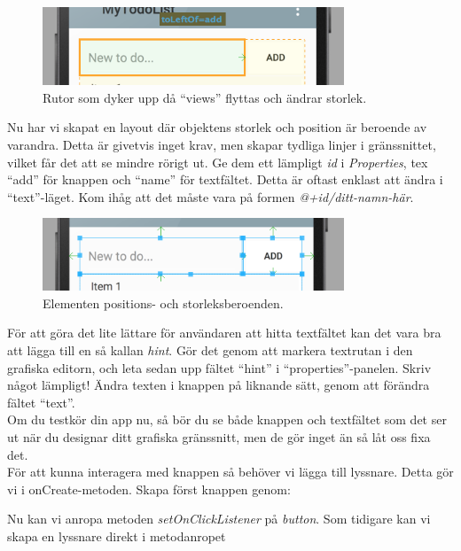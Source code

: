 \documentclass[11 pt, titlepage]{article} %
\begin{document}
\begin{figure}[ht!]
\centering
\includegraphics[width=90mm]{images/editing_layout.png}
\caption{Rutor som dyker upp då ``views'' flyttas och ändrar storlek.}
\label{overflow}
\end{figure}

Nu har vi skapat en layout där objektens storlek och position är beroende av varandra.
Detta är givetvis inget krav, men skapar tydliga linjer i gränssnittet, vilket får det att se mindre rörigt ut.
Ge dem ett lämpligt \textit{id} i \textit{Properties}, tex ``add'' för knappen och ``name'' för textfältet. Detta är oftast enklast att ändra i ``text''-läget.
Kom ihåg att det måste vara på formen \textit{@+id/ditt-namn-här}.\\

\begin{figure}[ht!]
\centering
\includegraphics[width=90mm]{images/layout.png}
\caption{Elementen positions- och storleksberoenden.}
\label{overflow}
\end{figure}

För att göra det lite lättare för användaren att hitta textfältet kan det vara bra att lägga till en så kallan \textit{hint}.
Gör det genom att markera textrutan i den grafiska editorn, och leta sedan upp fältet ``hint'' i ``properties''-panelen.
Skriv något lämpligt!
Ändra texten i knappen på liknande sätt, genom att förändra fältet ``text''. \\

Om du testkör din app nu, så bör du se både knappen och textfältet som det ser ut när du designar ditt grafiska gränssnitt, men de gör inget än så låt oss fixa det. \\

För att kunna interagera med knappen så behöver vi lägga till lyssnare. Detta gör vi i onCreate-metoden. Skapa först knappen genom: 

Nu kan vi anropa metoden \textit{setOnClickListener} på \textit{button}. Som tidigare kan vi skapa en lyssnare direkt i metodanropet

\end{document}
